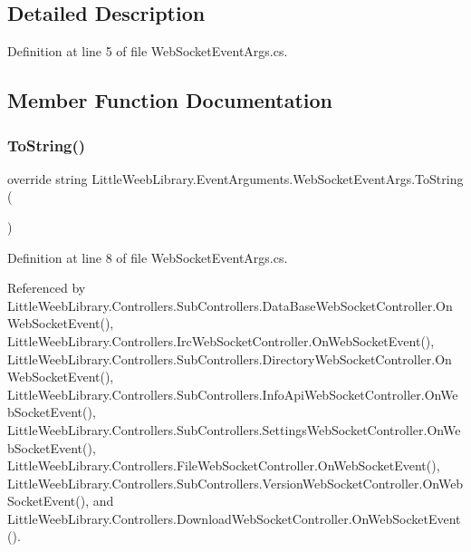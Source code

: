 \subsection{Detailed Description}


Definition at line 5 of file Web\+Socket\+Event\+Args.\+cs.



\subsection{Member Function Documentation}
\mbox{\label{class_little_weeb_library_1_1_event_arguments_1_1_web_socket_event_args_acf402c2f7fd4ddbf175fea7f921ea879}} 
\subsubsection{\texorpdfstring{To\+String()}{ToString()}}
{\footnotesize\ttfamily override string Little\+Weeb\+Library.\+Event\+Arguments.\+Web\+Socket\+Event\+Args.\+To\+String (\begin{DoxyParamCaption}{ }\end{DoxyParamCaption})}



Definition at line 8 of file Web\+Socket\+Event\+Args.\+cs.



Referenced by Little\+Weeb\+Library.\+Controllers.\+Sub\+Controllers.\+Data\+Base\+Web\+Socket\+Controller.\+On\+Web\+Socket\+Event(), Little\+Weeb\+Library.\+Controllers.\+Irc\+Web\+Socket\+Controller.\+On\+Web\+Socket\+Event(), Little\+Weeb\+Library.\+Controllers.\+Sub\+Controllers.\+Directory\+Web\+Socket\+Controller.\+On\+Web\+Socket\+Event(), Little\+Weeb\+Library.\+Controllers.\+Sub\+Controllers.\+Info\+Api\+Web\+Socket\+Controller.\+On\+Web\+Socket\+Event(), Little\+Weeb\+Library.\+Controllers.\+Sub\+Controllers.\+Settings\+Web\+Socket\+Controller.\+On\+Web\+Socket\+Event(), Little\+Weeb\+Library.\+Controllers.\+File\+Web\+Socket\+Controller.\+On\+Web\+Socket\+Event(), Little\+Weeb\+Library.\+Controllers.\+Sub\+Controllers.\+Version\+Web\+Socket\+Controller.\+On\+Web\+Socket\+Event(), and Little\+Weeb\+Library.\+Controllers.\+Download\+Web\+Socket\+Controller.\+On\+Web\+Socket\+Event().


